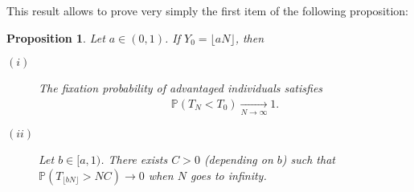\documentclass[11pt]{article}
\newtheorem{proposition}[theorem]{Proposition}
\theoremstyle{remark}
\numberwithin{equation}{section}
\begin{document}
This result allows to prove very simply the first item of the following proposition:
\begin{proposition}\label{prop-Y-TN} Let $a\in(0,1)$. If $Y_0=\lfloor aN\rfloor$, then 
\begin{description}
\item[$(i)$] The fixation probability of advantaged individuals satisfies \begin{align*}\mathbb{P}(T_N<T_0)\underset{N\rightarrow\infty}{\longrightarrow} 1. \end{align*} 
\item[$(ii)$] Let $b\in [a,1)$. There exists $C>0$ (depending on $b$) such that $\mathbb{P}(T_{\lfloor bN\rfloor}> N C)\rightarrow 0$ when $N$ goes to infinity. \\
\end{description}
\end{proposition}
\end{document}
